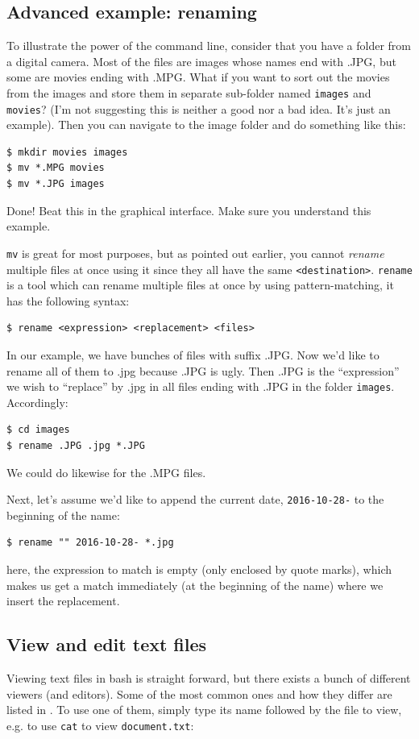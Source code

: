 \subsection{Advanced example: renaming}
To illustrate the power of the command line, consider that you have a folder from a digital camera. Most of the files are images whose names end with .JPG, but some are movies ending with .MPG. What if you want to sort out the movies from the images and store them in separate sub-folder named \verb|images| and \verb|movies|? (I'm not suggesting this is neither a good nor a bad idea. It's just an example). Then you can navigate to the image folder and do something like this:

\begin{verbatim}
$ mkdir movies images
$ mv *.MPG movies
$ mv *.JPG images
\end{verbatim}
Done! Beat this in the graphical interface. Make sure you understand this example.

\verb|mv| is great for most purposes, but as pointed out earlier, you cannot \emph{rename} multiple files at once using it since they all have the same \verb|<destination>|. \verb|rename| is a tool which can rename multiple files at once by using pattern-matching, it has the following syntax:

\begin{verbatim}
$ rename <expression> <replacement> <files>
\end{verbatim}
In our example, we have bunches of files with suffix .JPG. Now we'd like to rename all of them to .jpg because .JPG is ugly. Then .JPG is the ``expression'' we wish to ``replace'' by .jpg in all files ending with .JPG in the folder \verb|images|. Accordingly:

\begin{verbatim}
$ cd images
$ rename .JPG .jpg *.JPG
\end{verbatim}
We could do likewise for the .MPG files.

Next, let's assume we'd like to append the current date, \verb|2016-10-28-| to the beginning of the name:

\begin{verbatim}
$ rename "" 2016-10-28- *.jpg
\end{verbatim}
here, the expression to match is empty (only enclosed by quote marks), which makes us get a match immediately (at the beginning of the name) where we insert the replacement.

\subsection{View and edit text files}
Viewing text files in bash is straight forward, but there exists a bunch of different viewers (and editors). Some of the most common ones and how they differ are listed in . To use one of them, simply type its name followed by the file to view, e.g. to use \verb|cat| to view \verb|document.txt|:


